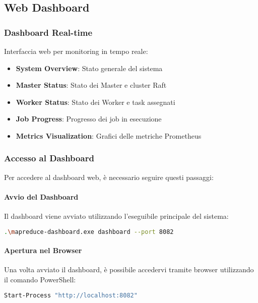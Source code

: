 \documentclass[12pt,a4paper]{article}
\begin{document}
\subsection{Web Dashboard}

\subsubsection{Dashboard Real-time}

Interfaccia web per monitoring in tempo reale:

\begin{itemize}
\item \textbf{System Overview}: Stato generale del sistema
\item \textbf{Master Status}: Stato dei Master e cluster Raft
\item \textbf{Worker Status}: Stato dei Worker e task assegnati
\item \textbf{Job Progress}: Progresso dei job in esecuzione
\item \textbf{Metrics Visualization}: Grafici delle metriche Prometheus
\end{itemize}

\subsubsection{Accesso al Dashboard}

Per accedere al dashboard web, è necessario seguire questi passaggi:

\paragraph{Avvio del Dashboard}
Il dashboard viene avviato utilizzando l'eseguibile principale del sistema:

\begin{lstlisting}[language=bash, caption=Comando per avviare il dashboard]
.\mapreduce-dashboard.exe dashboard --port 8082
\end{lstlisting}

\paragraph{Apertura nel Browser}
Una volta avviato il dashboard, è possibile accedervi tramite browser utilizzando il comando PowerShell:

\begin{lstlisting}[language=bash, caption=Comando per aprire il dashboard nel browser]
Start-Process "http://localhost:8082"
\end{lstlisting}
\end{document}
